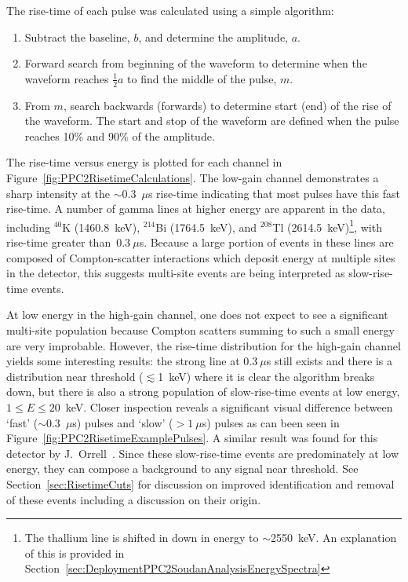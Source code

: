 			
	The rise-time of each pulse was calculated using a simple algorithm: 
				\begin{enumerate}
					\item Subtract the baseline, $b$, and determine the amplitude, $a$.
					\item Forward search from beginning of the waveform to determine when the waveform reaches 
					$\frac{1}{2}a$ to find the middle of the pulse, $m$.
					\item From $m$, search backwards (forwards) to determine start (end) of the rise of the waveform.  
					The start and stop of the waveform are defined when the pulse reaches 10\% and 90\% of the amplitude.
				\end{enumerate}
The rise-time versus energy is plotted for each channel in Figure~\ref{fig:PPC2RisetimeCalculations}.  The low-gain channel demonstrates a sharp intensity at the $\sim$0.3~$\mu$s rise-time indicating that most pulses have this fast rise-time.  A number of gamma lines at higher energy are apparent in the data, including $^{40}$K (1460.8~keV), $^{214}$Bi (1764.5~keV), and $^{208}$Tl (2614.5~keV)\footnote{The thallium line is shifted in down in energy to $\sim$2550~keV.  An explanation of this is provided in Section~\ref{sec:DeploymentPPC2SoudanAnalysisEnergySpectra}}, with rise-time greater than~$0.3~\mu$s.  Because a large portion of events in these lines are composed of Compton-scatter interactions which deposit energy at multiple sites in the detector, this suggests multi-site events are being interpreted as slow-rise-time events.  
	
At low energy in the high-gain channel, one does not expect to see a significant multi-site population because Compton scatters summing to such a small energy are very improbable.  However, the rise-time distribution for the high-gain channel yields some interesting results: the strong line at $0.3~\mu$s still exists and there is a distribution near threshold ($\lesssim$1~keV) where it is clear the algorithm breaks down, but there is also a strong population of slow-rise-time events at low energy, $1\leq E \leq20$~keV.  Closer inspection reveals a significant visual difference between `fast' ($\sim$0.3~$\mu$s) pulses and `slow' ($>1~\mu$s) pulses as can been seen in Figure~\ref{fig:PPC2RisetimeExamplePulses}.  A similar result was found for this detector by J.~Orrell~\cite{Orrell}.  Since these slow-rise-time events are predominately at low energy, they can compose a background to any signal near threshold.  See Section~\ref{sec:RisetimeCuts} for discussion on improved identification and removal of these events including a discussion on their origin.
	
